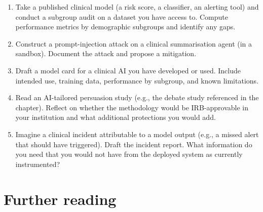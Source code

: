 \documentclass[
  letterpaper,
  11pt]{scrbook}
\begin{document}
\begin{enumerate}
\def\labelenumi{\arabic{enumi}.}
\item
  Take a published clinical model (a risk score, a classifier, an
  alerting tool) and conduct a subgroup audit on a dataset you have
  access to. Compute performance metrics by demographic subgroups and
  identify any gaps.
\item
  Construct a prompt-injection attack on a clinical summarisation agent
  (in a sandbox). Document the attack and propose a mitigation.
\item
  Draft a model card for a clinical AI you have developed or used.
  Include intended use, training data, performance by subgroup, and
  known limitations.
\item
  Read an AI-tailored persuasion study (e.g., the debate study
  referenced in the chapter). Reflect on whether the methodology would
  be IRB-approvable in your institution and what additional protections
  you would add.
\item
  Imagine a clinical incident attributable to a model output (e.g., a
  missed alert that should have triggered). Draft the incident report.
  What information do you need that you would not have from the deployed
  system as currently instrumented?
\end{enumerate}

\section{Further reading}\label{further-reading-10}
\end{document}
